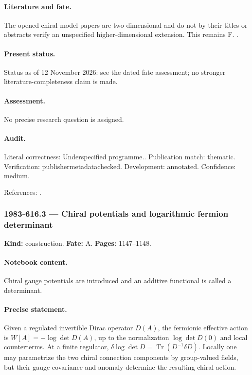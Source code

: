 \paragraph{Literature and fate.} The opened chiral-model papers are two-dimensional and do not by their titles or abstracts verify an unspecified higher-dimensional extension. This remains F. \citep{polyakovwiegmann1983goldstone,wiegmann1984sun}.

\paragraph{Present status.} Status as of 12 November 2026: see the dated fate assessment; no stronger literature-completeness claim is made.

\paragraph{Assessment.} No precise research question is assigned.

\paragraph{Audit.} Literal correctness: Underspecified programme.. Publication match: thematic. Verification: publishermetadatachecked. Development: annotated. Confidence: medium.

\noindent References: \citep{polyakovwiegmann1983goldstone,wiegmann1984sun}.\par

\subsubsection{1983-616.3 --- Chiral potentials and logarithmic fermion determinant}

\label{item:1983-616.3}

\noindent\textbf{Kind:} construction. \textbf{Fate:} A. \textbf{Pages:} 1147--1148.\par

\paragraph{Notebook content.} Chiral gauge potentials are introduced and an additive functional is called a determinant.

\paragraph{Precise statement.} Given a regulated invertible Dirac operator $D(A)$, the fermionic effective action is $W[A]=-\log\det D(A)$, up to the normalization $\log\det D(0)$ and local counterterms. At a finite regulator, $\delta\log\det D=\operatorname{Tr}(D^{-1}\delta D)$. Locally one may parametrize the two chiral connection components by group-valued fields, but their gauge covariance and anomaly determine the resulting chiral action.

